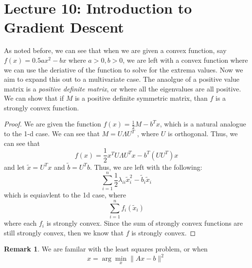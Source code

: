 \documentclass[11pt]{article}
\theoremstyle{definition}
\newtheorem{remark}{Remark}[section]
\begin{document}
\section{Lecture 10: Introduction to Gradient Descent}
As noted before, we can see that when we are given a convex function, say $f(x) = 0.5ax^2 - bx$ where $a > 0, b > 0$, we are left with a convex function where we can use the deriative of the function to solve for the extrema values. Now we aim to expand this out to a multivariate case. The anaolgue of a positive value matrix is a \emph{positive definite matrix}, or where all the eigenvalues are all positive. We can show that if $M$ is a positive definite symmetric matrix, than $f$ is a strongly convex function. 
\begin{proof}
  We are given the function $f(x) = \frac{1}{2} M - b^T x$, which is a natural analogue to the 1-d case. We can see that $M = U \Lambda U^T$ , where $U$ is orthogonal. Thus, we can see that
  \[
  f(x) = \frac{1}{2}x^T U \Lambda U^T x - b^T(UU^T)x
  \]
  and let $\tilde{x} = U^Tx$ and $\tilde{b} = U^Tb$. Thus, we are left with the following:
  \[
  \sum_{i=1}^n \frac{1}{2} \lambda_{ii} \tilde{x}_i^2 - \tilde{b}_i \tilde{x}_i
  \]
  which is equiavlent to the 1d case, where 
  \[
  \sum_{i = 1}^{n} f_i(\tilde{x}_i)
  \]
  where each $f_i$ is strongly convex. Since the sum of strongly convex functions are still strongly convex, then we know that $f$ is strongly convex. 
\end{proof}
\begin{remark}
  We are familar with the least squares problem, or when 
  \[
  x = \arg \min_{x} \|Ax -b \|^2
  \]
\end{remark}
\end{document}
